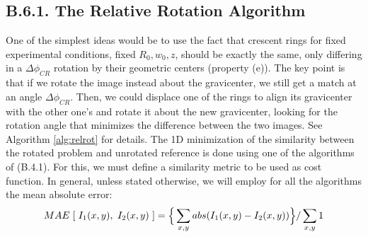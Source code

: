 \documentclass[11pt, a4paper, twoside]{article} %
\begin{document}
\subsection*{B.6.1. The Relative Rotation Algorithm \vspace{-0.25cm}}
One of the simplest ideas would be to use the fact that crescent rings for fixed experimental conditions, fixed $R_0,w_0,z$, should be exactly the same, only differing in a $\Delta\phi_{CR}$ rotation by their geometric centers (property (e)). The key point is that if we rotate the image instead about the gravicenter, we still get a match at an angle $\Delta\phi_{CR}$. Then, we could displace one of the rings to align its gravicenter with the other one's and rotate it about the new gravicenter, looking for the rotation angle that minimizes the difference between the two images. See Algorithm \ref{alg:relrot} for details. The 1D minimization of the similarity between the rotated problem and unrotated reference is done using one of the algorithms of (B.4.1). For this, we must define a similarity metric to be used as cost function. In general, unless stated otherwise, we will employ for all the algorithms the mean absolute error:\vspace{-0.05cm}
\begin{equation}\label{MAE} {\small MAE\; [\ I_1(x,y),\ I_2(x,y)\ ]=\Big\{\sum_{x,y}abs\qty(I_1(x,y)-I_2(x,y))\Big\}/\sum_{x,y}1}\vspace{-0.50cm}
\end{equation}
\vspace{-0.6cm}
\end{document}
